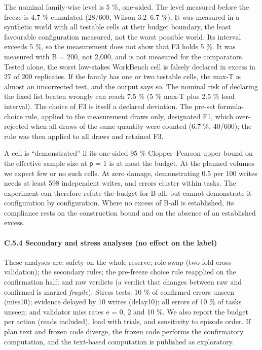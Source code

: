 The nominal family-wise level is 5 \%, one-sided. The level measured before the freeze is 4.7 \% cumulated (28/600, Wilson 3.2--6.7 \%). It was measured in a synthetic world with all testable cells at their budget boundary, the least favourable configuration measured, not the worst possible world. Its interval exceeds 5 \%, so the measurement does not show that F3 holds 5 \%. It was measured with B = 200, not 2,000, and is not measured for the comparators. Tested alone, the worst low-stakes WorkBench cell is falsely declared in excess in 27 of 200 replicates. If the family has one or two testable cells, the max-T is almost an uncorrected test, and the output says so. The nominal risk of declaring the fixed list beaten wrongly can reach 7.5 \% (5 \% max-T plus 2.5 \% load interval). The choice of F3 is itself a declared deviation. The pre-set formula-choice rule, applied to the measurement draws only, designated F1, which over-rejected when all draws of the same quantity were counted (6.7 \%, 40/600); the rule was then applied to all draws and retained F3.

A cell is ``demonstrated'' if its one-sided 95 \% Clopper--Pearson upper bound on the effective sample size at ρ = 1 is at most the budget. At the planned volumes we expect few or no such cells. At zero damage, demonstrating 0.5 per 100 writes needs at least 598 independent writes, and errors cluster within tasks. The experiment can therefore refute the budget for B-all, but cannot demonstrate it configuration by configuration. Where no excess of B-all is established, its compliance rests on the construction bound and on the absence of an established excess.

\paragraph{C.5.4 Secondary and stress analyses (no effect on the label)}\label{c.5.4-secondary-and-stress-analyses-no-effect-on-the-label}

These analyses are: safety on the whole reserve; role swap (two-fold cross-validation); the secondary rules; the pre-freeze choice rule reapplied on the confirmation half; and raw verdicts (a verdict that changes between raw and confirmed is marked \emph{fragile}). Stress tests: 10 \% of confirmed errors unseen (miss10); evidence delayed by 10 writes (delay10); all errors of 10 \% of tasks unseen; and validator miss rates e = 0, 2 and 10 \%. We also report the budget per action (reads included), load with trials, and sensitivity to episode order. If plan text and frozen code diverge, the frozen code performs the confirmatory computation, and the text-based computation is published as exploratory.

